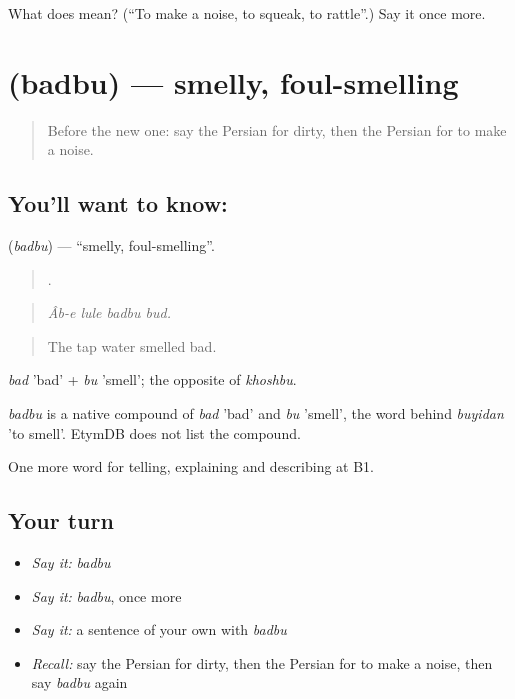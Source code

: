 \begin{tcolorbox}[breakable,colback=teal!4,colframe=teal!35!black,title={Before you move on}]
What does   mean? (\textquotedblleft{}To make a noise, to squeak, to rattle\textquotedblright{}.) Say it once more.
\end{tcolorbox}
\section[\texorpdfstring{\fa{بدبو} (badbu)}{بدبو (badbu)}]{ (badbu) — smelly, foul-smelling}

\label{lesson:FA-C440-badbu}



\begin{quote}
Before the new one: say the Persian for dirty, then the Persian for to make a noise.
\end{quote}

\subsection*{You'll want to know: }
\textbf{} (\emph{badbu}) — \textquotedblleft{}smelly, foul-smelling\textquotedblright{}.

\begin{quote}
   .
\end{quote}

\begin{quote}
\emph{Âb-e lule badbu bud.}
\end{quote}

\begin{quote}
The tap water smelled bad.
\end{quote}

\emph{bad} 'bad' + \emph{bu} 'smell'; the opposite of \emph{khoshbu}.

\begin{cousinweb}
\emph{badbu} is a native compound of \emph{bad} 'bad' and \emph{bu} 'smell', the word behind \emph{buyidan} 'to smell'. EtymDB does not list the compound.
\end{cousinweb}

\begin{grammarlens}[title={What you've built}]
One more word for telling, explaining and describing at B1.
\end{grammarlens}

\subsection*{Your turn}
\begin{itemize}
\raggedright
  \item \emph{Say it:} \emph{badbu}
  \item \emph{Say it:} \emph{badbu}, once more
  \item \emph{Say it:} a sentence of your own with \emph{badbu}
  \item \emph{Recall:} say the Persian for dirty, then the Persian for to make a noise, then say \emph{badbu} again
\end{itemize}

